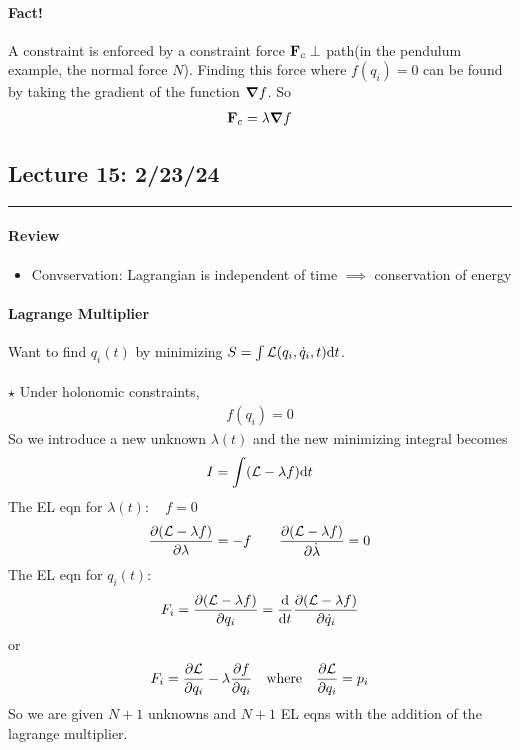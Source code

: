 \documentclass[../main.tex]{subfiles}
\begin{document}
\paragraph*{Fact!} A constraint is enforced by a constraint force $\vb F_c \perp$ path(in the
pendulum example, the normal force $N$). Finding this force where $f(q_i) = 0$ can be found by
taking the gradient of the function $\grad f$. So
\begin{align*}
    \vb F_c = \lambda \grad f
\end{align*}

\newpage
\subsection*{Lecture 15: \hfill 2/23/24}
\hrule \vspace{10px}
\paragraph*{Review}
\begin{itemize}
    \item Convservation: Lagrangian is independent of time $\implies$ conservation of energy
\end{itemize}

\paragraph*{Lagrange Multiplier} Want to find $q_i(t)$ by minimizing
$S = \int \mathcal{L}(q_i, \dot q_i, t) \dd t$.
\paragraph*{} $\star$ Under holonomic constraints,
\begin{align*}
    f(q_i) = 0
\end{align*}
So we introduce a new unknown $\lambda(t)$ and the new minimizing integral becomes
\begin{align*}
    I = \int (\mathcal{L} - \lambda f) \dd t
\end{align*}
The EL eqn for $\lambda(t):\quad f=0$
\begin{align*}
    \pdv{(\mathcal{L}- \lambda f)}{\lambda} = -f \qquad \pdv{(\mathcal{L}- \lambda f)}{\dot \lambda} = 0
\end{align*}
The EL eqn for $q_i(t)$:
\begin{align*}
    F_i = \pdv{(\mathcal{L}- \lambda f)}{q_i} = \dv{t} \pdv{(\mathcal{L}- \lambda f)}{\dot q_i}
\end{align*}
or
\begin{align*}
    F_i = \pdv{\lagr}{q_i} - \lambda \pdv{f}{q_i} \qqtext{where} \pdv{\lagr}{q_i} = p_i
\end{align*}
So we are given $N+1$ unknowns and $N+1$ EL eqns with the addition of the lagrange multiplier.
\end{document}

